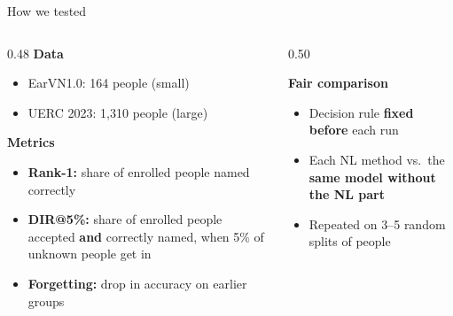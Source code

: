 \documentclass[aspectratio=169,10pt]{beamer}
\begin{document}
\begin{frame}{How we tested}
\begin{columns}[T]
\begin{column}{0.48\textwidth}
\small
\textbf{Data}
\begin{itemize}
  \item EarVN1.0: 164 people (small)
  \item UERC 2023: 1{,}310 people (large)
\end{itemize}

\medskip
\textbf{Metrics}
\begin{itemize}
  \item \textbf{Rank-1:} share of enrolled people named correctly
  \item \textbf{DIR@5\%:} share of enrolled people accepted \textbf{and} correctly named, when 5\% of unknown people get in
  \item \textbf{Forgetting:} drop in accuracy on earlier groups
\end{itemize}
\end{column}
\begin{column}{0.50\textwidth}
\centering
{}

\raggedright\small
\textbf{Fair comparison}
\begin{itemize}
  \item Decision rule \textbf{fixed before} each run
  \item Each NL method vs.\ the \textbf{same model without the NL part}
  \item Repeated on 3--5 random splits of people
\end{itemize}
\end{column}
\end{columns}
\end{frame}
\end{document}
